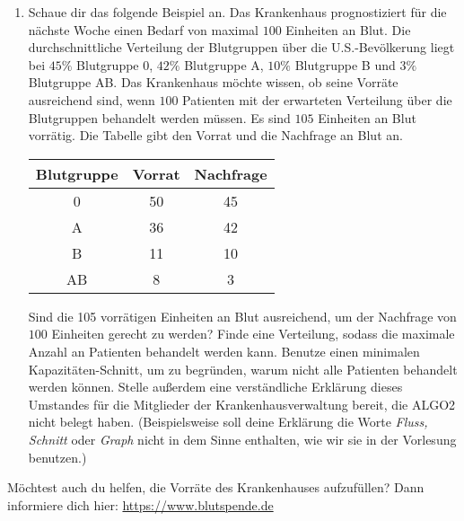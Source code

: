 \documentclass{uebung_cs}
\begin{document}
\begin{aufgabe}[Blutspende]
\begin{enumerate}
    	\item Schaue dir das folgende Beispiel an. Das Krankenhaus prognostiziert für die nächste Woche einen Bedarf von maximal $100$ Einheiten an Blut. Die durchschnittliche Verteilung der Blutgruppen über die U.S.-Bevölkerung liegt bei $45\%$ Blutgruppe 0, $42\%$ Blutgruppe A, $10\%$ Blutgruppe B und $3\%$ Blutgruppe AB. Das Krankenhaus möchte wissen, ob seine Vorräte ausreichend sind, wenn $100$ Patienten mit der erwarteten Verteilung über die Blutgruppen behandelt werden müssen. Es sind $105$ Einheiten an Blut vorrätig. Die Tabelle gibt den Vorrat und die Nachfrage an Blut an.
    	
    	\vspace{4mm}
    	\begin{center}
    	\begin{tabular}{|c|c|c|}
    	\hline 
    	Blutgruppe & Vorrat & Nachfrage \\ 
    	\hline 
    	0 & 50 & 45 \\ 
    	\hline 
    	A & 36 & 42 \\ 
    	\hline 
    	B & 11 & 10 \\ 
    	\hline 
    	AB & 8 & 3 \\ 
    	\hline 
    	\end{tabular}
    	\end{center}
    	\vspace{4mm}
    	Sind die 105 vorrätigen Einheiten an Blut ausreichend, um der Nachfrage von $100$ Einheiten gerecht zu werden? Finde eine Verteilung, sodass die maximale Anzahl an Patienten behandelt werden kann. Benutze einen minimalen Kapazitäten-Schnitt, um zu begründen, warum nicht alle Patienten behandelt werden können. Stelle außerdem eine verständliche Erklärung dieses Umstandes für die Mitglieder der Krankenhausverwaltung bereit, die ALGO2 nicht belegt haben. (Beispielsweise soll deine Erklärung die Worte \textit{Fluss, Schnitt} oder \textit{Graph} nicht in dem Sinne enthalten, wie wir sie in der Vorlesung benutzen.)
    \end{enumerate}
    \vspace{4mm}
    Möchtest auch du helfen, die Vorräte des Krankenhauses aufzufüllen? Dann informiere dich hier: \url{https://www.blutspende.de}
\end{aufgabe}
\end{document}
